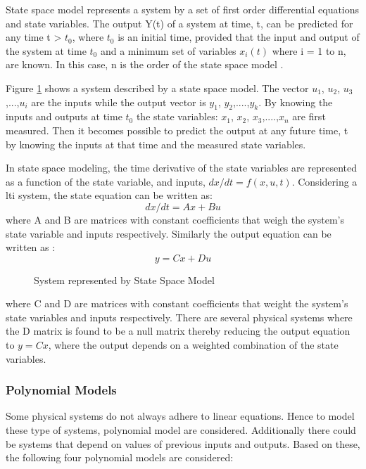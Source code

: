 \documentclass[article,type=msc,colorback,12pt,accentcolor=tud8b,table]{tudthesis}
\begin{document}
State space model represents a system by a set of first order differential equations and state variables. The output Y(t) of a system at time, t, can be predicted for any time t > $t_0$,  where $t_0$ is an initial time, provided that the input and output of the system at time $t_0$ and a minimum set of variables $x_i(t)$ where i = 1 to n, are known. In this case, n is the order of the state space model \cite{ljung1987system}. 

Figure \ref{fig:state_space_model} shows a system described by a state space model. The vector $u_1$, $u_2$, $u_3$,...,$u_i$ are the inputs while the output vector is $y_1$, $y_2$,....,$y_k$. By knowing the inputs and outputs at time $t_0$ the state variables: $x_1$, $x_2$, $x_3$,....,$x_n$ are first measured. Then it becomes possible to predict the output at any future time, t by knowing the inputs at that time and the measured state variables.

In state space modeling, the time derivative of the state variables are represented as a function of the state variable, and inputs, $dx/dt = f(x,u,t)$. Considering a \gls{lti} system, the state equation can be written as\cite{ljung1987system}: $$ dx/dt = Ax + Bu $$ where A and B are matrices with constant coefficients that weigh the system's state variable and inputs respectively. Similarly the output equation can be written as \cite{ljung1987system}: $$ y = Cx + Du $$ 

\begin{figure}
	\begin{center}
		\makebox[\textwidth]{\texttt{[image: B6]}}
	\end{center}
	\caption{System represented by State Space Model}
	\label{fig:state_space_model}
\end{figure}

where C and D are matrices with constant coefficients that weight the system's state variables and inputs respectively. There are several physical systems where the D matrix is found to be a null matrix thereby reducing the output equation to $ y = Cx $, where the output depends on a weighted combination of the state variables.

\subsubsection{Polynomial Models}
	
	Some physical systems do not always adhere to linear equations. Hence to model these type of systems, polynomial model are considered. Additionally there could be systems that depend on values of previous inputs and outputs. Based on these, the following four polynomial models are considered\cite{ljung1998system, ljung1999system}:
	
\end{document}
